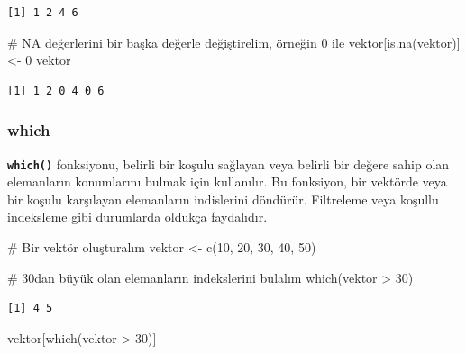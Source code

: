 \documentclass[
  letterpaper,
  DIV=11,
  numbers=noendperiod]{scrreprt}
\newenvironment{Shaded}{\begin{snugshade}}{\end{snugshade}}
\newcommand{\CommentTok}[1]{\textcolor[rgb]{0.37,0.37,0.37}{#1}}
\newcommand{\DecValTok}[1]{\textcolor[rgb]{0.68,0.00,0.00}{#1}}
\newcommand{\FunctionTok}[1]{\textcolor[rgb]{0.28,0.35,0.67}{#1}}
\newcommand{\NormalTok}[1]{\textcolor[rgb]{0.00,0.23,0.31}{#1}}
\newcommand{\OtherTok}[1]{\textcolor[rgb]{0.00,0.23,0.31}{#1}}
\newcommand{\SpecialCharTok}[1]{\textcolor[rgb]{0.37,0.37,0.37}{#1}}
\begin{document}
\begin{verbatim}
[1] 1 2 4 6
\end{verbatim}

\begin{Shaded}
\begin{Highlighting}[]
\CommentTok{\# NA değerlerini bir başka değerle değiştirelim, örneğin 0 ile}
\NormalTok{vektor[}\FunctionTok{is.na}\NormalTok{(vektor)] }\OtherTok{\textless{}{-}} \DecValTok{0}
\NormalTok{vektor}
\end{Highlighting}
\end{Shaded}

\begin{verbatim}
[1] 1 2 0 4 0 6
\end{verbatim}

\subsubsection{\texorpdfstring{\textbf{which}}{which}}\label{which}

\textbf{\texttt{which()}} fonksiyonu, belirli bir koşulu sağlayan veya
belirli bir değere sahip olan elemanların konumlarını bulmak için
kullanılır. Bu fonksiyon, bir vektörde veya bir koşulu karşılayan
elemanların indislerini döndürür. Filtreleme veya koşullu indeksleme
gibi durumlarda oldukça faydalıdır.

\begin{Shaded}
\begin{Highlighting}[]
\CommentTok{\# Bir vektör oluşturalım}
\NormalTok{vektor }\OtherTok{\textless{}{-}} \FunctionTok{c}\NormalTok{(}\DecValTok{10}\NormalTok{, }\DecValTok{20}\NormalTok{, }\DecValTok{30}\NormalTok{, }\DecValTok{40}\NormalTok{, }\DecValTok{50}\NormalTok{)}

\CommentTok{\# 30\textquotesingle{}dan büyük olan elemanların indekslerini bulalım}
\FunctionTok{which}\NormalTok{(vektor }\SpecialCharTok{\textgreater{}} \DecValTok{30}\NormalTok{)}
\end{Highlighting}
\end{Shaded}

\begin{verbatim}
[1] 4 5
\end{verbatim}

\begin{Shaded}
\begin{Highlighting}[]
\NormalTok{vektor[}\FunctionTok{which}\NormalTok{(vektor }\SpecialCharTok{\textgreater{}} \DecValTok{30}\NormalTok{)]}
\end{Highlighting}
\end{Shaded}
\end{document}
